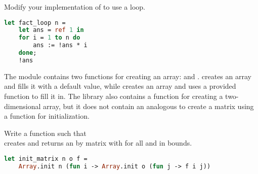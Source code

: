 Modify your implementation of  to use a loop.

\begin{lstlisting}[language=OCaml]
let fact_loop n =
	let ans = ref 1 in
	for i = 1 to n do
		ans := !ans * i
	done;
	!ans
\end{lstlisting}

The  module contains two functions for creating an array:  and .  creates an array and fills it with a default value, while  creates an array and uses a provided function to fill it in. The library also contains a function  for creating a two-dimensional array, but it does not contain an analogous  to create a matrix using a function for initialization.

Write a function  such that \\  creates and returns an  by  matrix  with  for all  and  in bounds.

\begin{lstlisting}[language=OCaml]
let init_matrix n o f =
	Array.init n (fun i -> Array.init o (fun j -> f i j))
\end{lstlisting}
